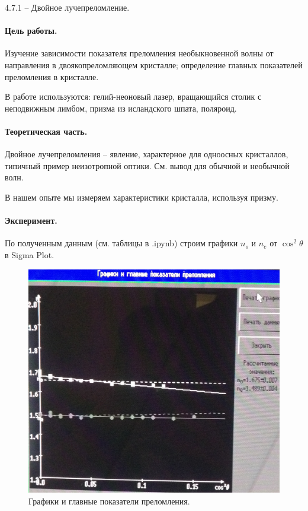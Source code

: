 \documentclass{../lab_class}
\begin{document}
{\Large 4.7.1 -- Двойное лучепреломление.}

\paragraph{Цель работы.}
Изучение  зависимости  показателя  преломления необыкновенной волны от направления в двоякопреломляющем кристалле; определение главных показателей преломления в кристалле.

В работе используются: гелий-неоновый лазер, вращающийся столик с неподвижным лимбом, призма из исландского шпата, поляроид.

\paragraph{Теоретическая часть.}
Двойное лучепреломления -- явление, характерное для одноосных кристаллов, типичный пример неизотропной оптики. См. вывод для обычной и необычной волн.

В нашем опыте мы измеряем характеристики кристалла, используя призму. 

\paragraph{Эксперимент.}

По полученным данным (см. таблицы в .ipynb) строим графики $n_o$ и $n_e$ от $\cos^2 \theta$ в Sigma Plot.

\begin{figure}[H]
	\centering
	\includegraphics[width = 0.8 \textwidth]{screen.png}
	\caption{Графики и главные показатели преломления.}
\end{figure}
\end{document}
